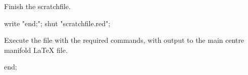 Finish the scratchfile.
\begin{reduce}
write "end;";
shut "scratchfile.red";
\end{reduce}

Execute the file with the required commands, with output to the main centre manifold LaTeX file.


\begin{reduce}
end;
\end{reduce}
